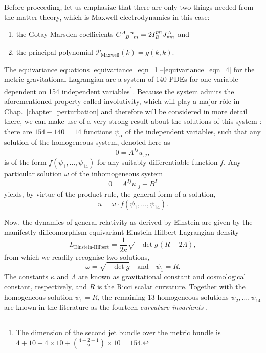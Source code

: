Before proceeding, let us emphasize that there are only two things needed from the matter theory, which is Maxwell electrodynamics in this case:
\begin{enumerate}
  \item the Gotay-Marsden coefficients $\gmc{A}{B}{n}{m} = 2 I_B^{pn} J^A_{pm}$ and
  \item the principal polynomial $\mathcal P_\text{Maxwell}(k) = g(k,k)$.
\end{enumerate}

The equivariance equations \eqref{equivariance_eqn_1}--\eqref{equivariance_eqn_4} for the metric gravitational Lagrangian are a system of 140 PDEs for one variable dependent on 154 independent variables\footnote{The dimension of the second jet bundle over the metric bundle is $4+10+4\times 10 + \binom{4 + 2 - 1}{2}\times 10=154$.}. Because the system admits the aforementioned property called involutivity, which will play a major r\^ole in Chap.~\ref{chapter_perturbation} and therefore will be considered in more detail there, we can make use of a very strong result about the solutions of this system \cite{Seiler_2010}: there are $154-140=14$ functions $\psi_\alpha$ of the independent variables, such that any solution of the homogeneous system, denoted here as
\begin{equation}
  0 = A^{Ij} u_{,j},
\end{equation}
is of the form $f(\psi_1,\dots,\psi_{14})$ for any suitably differentiable function $f$. Any particular solution $\omega$ of the inhomogeneous system
\begin{equation}
  0 = A^{Ij} u_{,j} + B^I
\end{equation}
yields, by virtue of the product rule, the general form of a solution,
\begin{equation}\label{general_metric_solution}
  u = \omega\cdot f(\psi_1,\dots,\psi_{14}).
\end{equation}

Now, the dynamics of general relativity as derived by Einstein are given by the manifestly diffeomorphism equivariant Einstein-Hilbert Lagrangian density
\begin{equation}\label{einstein_hilbert}
  L_\text{Einstein-Hilbert} = \frac{1}{2\kappa} \sqrt{-\operatorname{det}g}(R - 2\Lambda),
\end{equation}
from which we readily recognise two solutions,
\begin{equation}
  \omega = \sqrt{-\operatorname{det}g}\quad\text{and}\quad \psi_1 = R.
\end{equation}
The constants $\kappa$ and $\Lambda$ are known as gravitational constant and cosmological constant, respectively, and $R$ is the Ricci scalar curvature. Together with the homogeneous solution $\psi_1=R$, the remaining 13 homogeneous solutions $\psi_2,\dots,\psi_{14}$ are known in the literature as the fourteen \emph{curvature invariants} \cite{Narlikar_1949,Zakhary_1997}.

